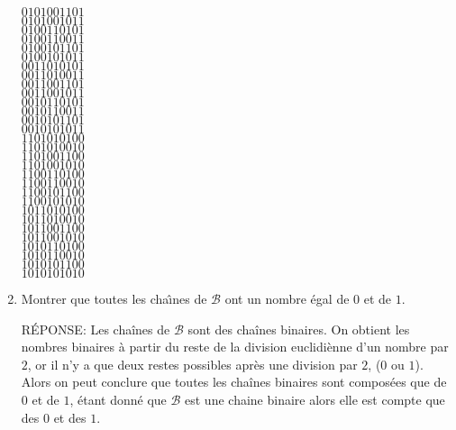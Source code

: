 \begin{enumerate}[\bf 1)]
\begin{framed}
$0101001101$ \\ $0101001011$ \\ $0100110101$ \\ $010011001 1$ \\ $0100101101$ \\ $0100101011$ \\ $0011010101$ \\ $0011010011$ \\ $0011001101$ \\ $0011001011$ \\ $0010110101$ \\ $0010110011$ \\ $0010101101$ \\ $0010101011$ \\ $1101010100$ \\ $1101010010$ \\
$1101001100$ \\ $1101001010$ \\ $1100110100$ \\ $1100110010$ \\ $1100101100$ \\ $1100101010$ \\ $1011010100$ \\ $1011010010$ \\ $1011001100$ \\ $1011001010$ \\ $1010110100$ \\ $1010110010$ \\ $1010101100$ \\ $1010101010$
\end{framed}


\item{} Montrer que toutes les cha{\^\i}nes  de $\mathcal{B}$ ont un nombre \'egal de $0$ et de $1$.

\begin{framed}

RÉPONSE: Les chaînes de $\mathcal{B}$ sont des chaînes binaires. On obtient les nombres binaires à partir du reste de la division euclidiènne d'un nombre par $2$, or il n'y a que deux restes possibles après une division par $2$, ($0$ ou $1$).
Alors on peut conclure que toutes les chaînes binaires sont composées que de $0$ et de $1$, étant donné que $\mathcal{B}$ est une chaine binaire alors elle est compte que des $0$ et des $1$.


\end{framed}
\end{enumerate}
